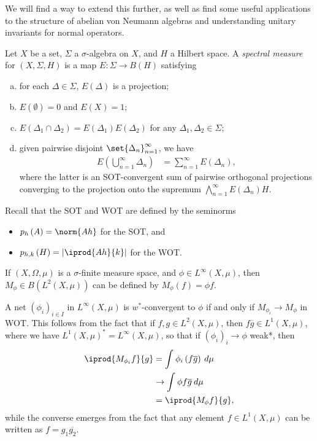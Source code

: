 \documentclass[10pt]{mypackage}
\begin{document}
We will find a way to extend this further, as well as find some useful applications to the structure of abelian von Neumann algebras and understanding unitary invariants for normal operators.
\begin{definition}
  Let $X$ be a set, $\Sigma$ a $\sigma$-algebra on $X$, and $H$ a Hilbert space. A \textit{spectral measure} for $\left( X,\Sigma,H \right)$ is a map $E\colon \Sigma\rightarrow B\left( H \right)$ satisfying
  \begin{enumerate}[(a)]
    \item for each $\Delta\in \Sigma$, $E\left( \Delta \right)$ is a projection;
    \item $E\left( \emptyset \right) = 0$ and $E\left( X \right) = 1$;
    \item $E\left( \Delta_1\cap \Delta_2 \right) = E\left( \Delta_1 \right)E\left( \Delta_2 \right)$ for any $\Delta_1,\Delta_2\in \Sigma$;
    \item given pairwise disjoint $\set{\Delta_n}_{n=1}^{\infty}$, we have
      \begin{align*}
        E\left( \bigcup_{n=1}^{\infty}\Delta_n \right) &= \sum_{n=1}^{\infty} E\left( \Delta_n \right),
      \end{align*}
      where the latter is an SOT-convergent sum of pairwise orthogonal projections converging to the projection onto the supremum $\bigwedge_{n=1}^{\infty}E\left( \Delta_n \right)H$.
  \end{enumerate}
\end{definition}
Recall that the SOT and WOT are defined by the seminorms
\begin{itemize}
  \item $p_h\left( A \right) = \norm{Ah}$ for the SOT, and
  \item $p_{h,k}\left( H \right) = \left\vert \iprod{Ah}{k} \right\vert$ for the WOT.
\end{itemize}
\begin{example}
  If $\left( X,\Omega,\mu \right)$ is a $\sigma$-finite measure space, and $\phi\in L^{\infty}\left( X,\mu \right)$, then $M_{\phi}\in B\left( L^2\left( X,\mu \right) \right)$ can be defined by $M_{\phi}\left( f \right) = \phi f$.

  A net $\left( \phi_i \right)_{i\in I}$ in $L^{\infty}\left( X,\mu \right)$ is $w^{\ast}$-convergent to $\phi$ if and only if $M_{\phi_i}\rightarrow M_{\phi}$ in WOT. This follows from the fact that if $f,g\in L^2\left( X,\mu \right)$, then $f \overline{g}\in L^1\left( X,\mu \right)$, where we have $L^1\left( X,\mu \right)^{\ast} = L^{\infty}\left( X,\mu \right)$, so that if $\left( \phi_i \right)_i\rightarrow \phi$ weak*, then
  \begin{align*}
    \iprod{M_{\phi_i}f}{g} &= \int_{}^{} \phi_i \left( f \overline{g} \right)\:d\mu\\
                           &\rightarrow \int_{}^{} \phi f \overline{g}\:d\mu\\
                           &= \iprod{M_{\phi}f}{g},
  \end{align*}
  while the converse emerges from the fact that any element $f\in L^1\left( X,\mu \right)$ can be written as $ f = g_1 \overline{g_2} $.
\end{example}
\end{document}
